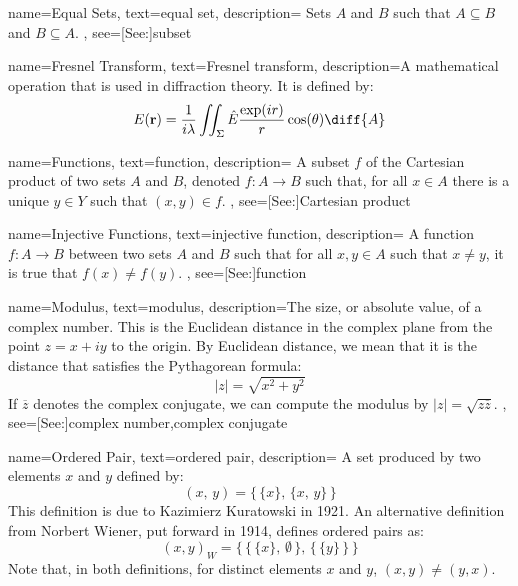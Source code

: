 {
    name={Equal Sets},
    text={equal set},
    description={
        Sets $A$ and $B$ such that $A\subseteq{B}$ and $B\subseteq{A}$.
    },
    see=[See:]{subset}
}

{
    name={Fresnel Transform},
    text={Fresnel transform},
    description={A mathematical operation that is used in
                 diffraction theory. It is defined by:
                 \begin{equation*}
                     E(\mathbf{r})=\frac{1}{i\lambda}
                     \iint_{\Sigma}\hat{E}\frac{\exp(ir)}{r}
                     \cos(\theta)\diff{A}
                 \end{equation*}
                }
}

{
    name={Functions},
    text={function},
    description={
        A subset $f$ of the Cartesian product of two sets $A$ and $B$, denoted
        $f:A\rightarrow{B}$ such that, for all $x\in{A}$ there is a unique
        $y\in{Y}$ such that $(x,y)\in{f}$.
    },
    see=[See:]{Cartesian product}
}

{
    name={Injective Functions},
    text={injective function},
    description={
        A function $f:A\rightarrow{B}$ between two sets $A$ and $B$ such
        that for all $x,y\in{A}$ such that $x\ne{y}$, it is true that
        $f(x)\ne{f}(y)$.
    },
    see=[See:]{function}
}

{
    name={Modulus},
    text={modulus},
    description={The size, or absolute value, of a complex number. This
                 is the Euclidean distance in the complex plane from the
                 point $z=x+iy$ to the origin. By Euclidean distance,
                 we mean that it is the distance that satisfies the
                 Pythagorean formula:
                 \begin{equation*}
                     |z|=\sqrt{x^{2}+y^{2}}
                 \end{equation*}
                 If $\overline{z}$ denotes the complex conjugate,
                 we can compute the modulus by
                 $|z|=\sqrt{z\overline{z}}$.
                },
    see=[See:]{complex number,complex conjugate}
}

{
    name={Ordered Pair},
    text={ordered pair},
    description={
        A set produced by two elements $x$ and $y$ defined by:
        \begin{equation*}
            (x,\,y)=\big\{\,\{x\},\,\{x,\,y\}\,\big\}
        \end{equation*}
        This definition is due to Kazimierz Kuratowski in 1921. An alternative
        definition from Norbert Wiener, put forward in 1914, defines ordered
        pairs as:
        \begin{equation*}
            (x,y)_{W}=\Big\{\,\big\{\,\{x\},\,\emptyset\,\big\},
                            \,\big\{\,\{y\}\,\big\}\,\Big\}
        \end{equation*}
        Note that, in both definitions, for distinct elements $x$ and $y$,
        $(x,y)\ne(y,x)$.
    }
}

